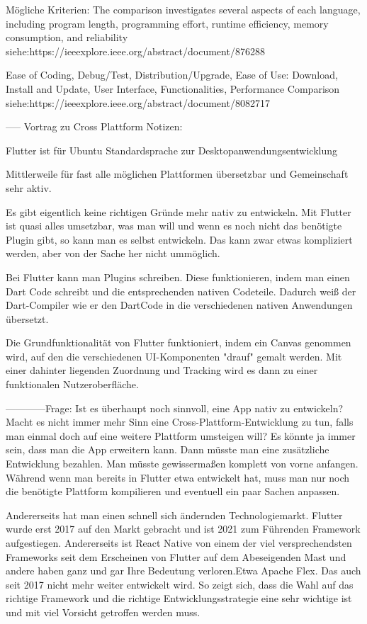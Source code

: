 Mögliche Kriterien:
The comparison investigates several aspects of each language, including program length, programming effort, runtime efficiency, memory consumption, and reliability
siehe:https://ieeexplore.ieee.org/abstract/document/876288

Ease of Coding, Debug/Test, Distribution/Upgrade, Ease of Use: Download, Install and Update, User Interface, Functionalities, Performance Comparison 
siehe:https://ieeexplore.ieee.org/abstract/document/8082717

-----
Vortrag zu Cross Plattform Notizen:

Flutter ist für Ubuntu Standardsprache zur Desktopanwendungsentwicklung

Mittlerweile für fast alle möglichen Plattformen übersetzbar und Gemeinschaft sehr aktiv.

Es gibt eigentlich keine richtigen Gründe mehr nativ zu entwickeln. Mit Flutter ist quasi alles umsetzbar, was man will und wenn es noch nicht das benötigte Plugin gibt, so kann man es selbst entwickeln. Das kann zwar etwas kompliziert werden, aber von der Sache her nicht ummöglich.

Bei Flutter kann man Plugins schreiben. Diese funktionieren, indem man einen Dart Code schreibt und die entsprechenden nativen Codeteile. Dadurch weiß der Dart-Compiler wie er den DartCode in die verschiedenen nativen Anwendungen übersetzt.

Die Grundfunktionalität von Flutter funktioniert, indem ein Canvas genommen wird, auf den die verschiedenen UI-Komponenten "drauf" gemalt werden. Mit einer dahinter liegenden Zuordnung und Tracking wird es dann zu einer funktionalen Nutzeroberfläche.

------------Frage: Ist es überhaupt noch sinnvoll, eine App nativ zu entwickeln? Macht es nicht immer mehr Sinn eine Cross-Plattform-Entwicklung zu tun, falls man einmal doch auf eine weitere Plattform umsteigen will? 
Es könnte ja immer sein, dass man die App erweitern kann. Dann müsste man eine zusätzliche Entwicklung bezahlen. Man müsste gewissermaßen komplett von vorne anfangen. Während wenn man bereits in Flutter etwa entwickelt hat, muss man nur noch die benötigte Plattform kompilieren und eventuell ein paar Sachen anpassen. 

Andererseits hat man einen schnell sich ändernden Technologiemarkt. Flutter wurde erst 2017 auf den Markt gebracht und ist 2021 zum Führenden Framework aufgestiegen. Andererseits ist React Native von einem der viel versprechendsten Frameworks seit dem Erscheinen von Flutter auf dem Abeseigenden Mast und andere haben ganz und gar Ihre Bedeutung verloren.Etwa Apache Flex. Das auch seit 2017 nicht mehr weiter entwickelt wird. So zeigt sich, dass die Wahl auf das richtige Framework und die richtige Entwicklungsstrategie eine sehr wichtige ist und mit viel Vorsicht getroffen werden muss.

